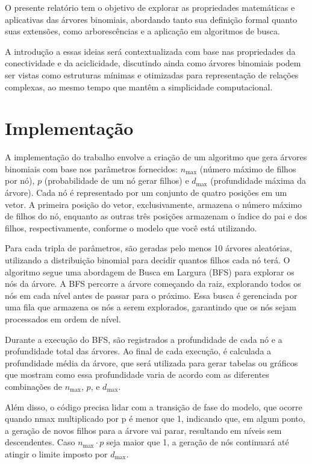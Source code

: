 \documentclass[12pt, a4paper]{scrreprt}
\begin{document}
O presente relatório tem o objetivo de explorar as propriedades matemáticas e aplicativas das árvores binomiais, abordando tanto sua definição formal quanto suas extensões, como arborescências e a aplicação em algoritmos de busca.

A introdução a essas ideias será contextualizada com base nas propriedades da conectividade e da aciclicidade, discutindo ainda como árvores binomiais podem ser vistas como estruturas mínimas e otimizadas para representação de relações complexas, ao mesmo tempo que mantêm a simplicidade computacional.

\chapter{Implementação}
A implementação do trabalho envolve a criação de um algoritmo que gera árvores binomiais com base nos parâmetros fornecidos: \( n_{\text{max}} \) (número máximo de filhos por nó), \( p \) (probabilidade de um nó gerar filhos) e \( d_{\text{max}} \) (profundidade máxima da árvore). Cada nó é representado por um conjunto de quatro posições em um vetor. A primeira posição do vetor, exclusivamente, armazena o número máximo de filhos do nó, enquanto as outras três posições armazenam o índice do pai e dos filhos, respectivamente, conforme o modelo que você está utilizando.

Para cada tripla de parâmetros, são geradas pelo menos 10 árvores aleatórias, utilizando a distribuição binomial para decidir quantos filhos cada nó terá. O algoritmo segue uma abordagem de Busca em Largura (BFS) para explorar os nós da árvore. A BFS percorre a árvore começando da raiz, explorando todos os nós em cada nível antes de passar para o próximo. Essa busca é gerenciada por uma fila que armazena os nós a serem explorados, garantindo que os nós sejam processados em ordem de nível.

Durante a execução do BFS, são registrados a profundidade de cada nó e a profundidade total das árvores. Ao final de cada execução, é calculada a profundidade média da árvore, que será utilizada para gerar tabelas ou gráficos que mostram como essa profundidade varia de acordo com as diferentes combinações de \( n_{\text{max}} \), \( p \), e \( d_{\text{max}} \).

Além disso, o código precisa lidar com a transição de fase do modelo, que ocorre quando nmax multiplicado por p é menor que 1, indicando que, em algum ponto, a geração de novos filhos para a árvore vai parar, resultando em níveis sem descendentes. Caso \( n_{\text{max}} \cdot p \) seja maior que 1, a geração de nós continuará até atingir o limite imposto por \( d_{\text{max}} \).
\end{document}
